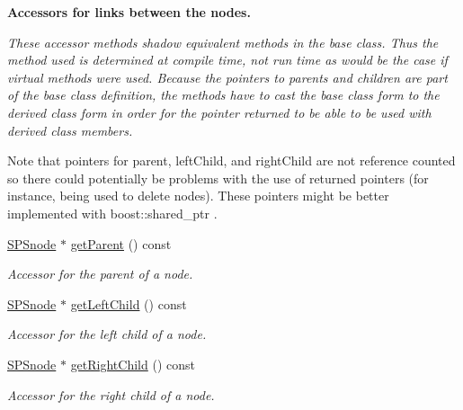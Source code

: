 \begin{Indent}{\bf \-Accessors for links between the nodes.}\par
{\em \-These accessor methods shadow equivalent methods in the base class. \-Thus the method used is determined at compile time, not run time as would be the case if virtual methods were used. \-Because the pointers to parents and children are part of the base class definition, the methods have to cast the base class form to the derived class form in order for the pointer returned to be able to be used with derived class members.

\-Note that pointers for parent, left\-Child, and right\-Child are not reference counted so there could potentially be problems with the use of returned pointers (for instance, being used to delete nodes). \-These pointers might be better implemented with boost\-::shared\-\_\-ptr . }\begin{DoxyCompactItemize}
\item 
\hyperlink{classsubpavings_1_1SPSnode}{\-S\-P\-Snode} $\ast$ \hyperlink{classsubpavings_1_1SPSnode_a88c1d25d8e0b9738f5199cc4435c08b4}{get\-Parent} () const 
\begin{DoxyCompactList}\small\item\em \-Accessor for the parent of a node. \end{DoxyCompactList}\item 
\hyperlink{classsubpavings_1_1SPSnode}{\-S\-P\-Snode} $\ast$ \hyperlink{classsubpavings_1_1SPSnode_af7588b657e2819dd5dda525e08143ffc}{get\-Left\-Child} () const 
\begin{DoxyCompactList}\small\item\em \-Accessor for the left child of a node. \end{DoxyCompactList}\item 
\hyperlink{classsubpavings_1_1SPSnode}{\-S\-P\-Snode} $\ast$ \hyperlink{classsubpavings_1_1SPSnode_acc7d3e22be28d76da5c8c228aaaa95c7}{get\-Right\-Child} () const 
\begin{DoxyCompactList}\small\item\em \-Accessor for the right child of a node. \end{DoxyCompactList}\end{DoxyCompactItemize}
\end{Indent}
